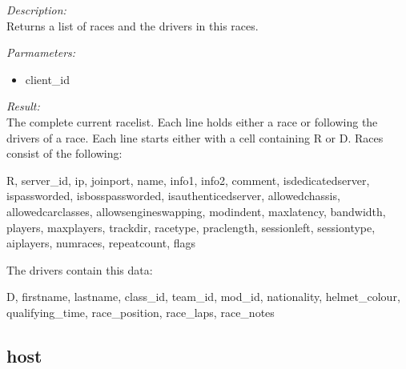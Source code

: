 \begin{description}
\item {\it Description:}\\
Returns a list of races and the drivers in this races.
\item {\it Parmameters:}
\begin{itemize}
\item client\_id
\end{itemize}
\item {\it Result:}\\
The complete current racelist. Each line holds either a race or following the drivers of a race. Each line starts either with a cell containing R or D. Races consist of the following: 
				
			R, 
			server\_id, 
			ip, 
			joinport, 
			name, 
			info1, 
			info2, 
			comment, 
			isdedicatedserver, 
			ispassworded, 
			isbosspassworded, 
			isauthenticedserver, 
			allowedchassis, 
			allowedcarclasses, 
			allowsengineswapping, 
			modindent, 
			maxlatency, 
			bandwidth, 
			players,
			maxplayers, 
			trackdir, 
			racetype, 
			praclength, 
			sessionleft, 
			sessiontype,
			aiplayers,
			numraces,
			repeatcount,
			flags


			The drivers contain this data:

			D,
			firstname,
			lastname,
			class\_id,
			team\_id,
			mod\_id,
			nationality,
			helmet\_colour,
			qualifying\_time,
			race\_position,
			race\_laps,
			race\_notes
			
\end{description}

\subsection{host}

